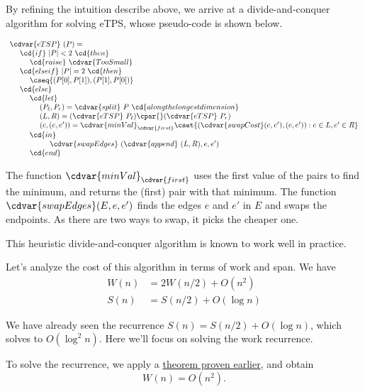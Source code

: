 \begin{algorithm}

By refining the intuition describe above, we arrive at a
divide-and-conquer algorithm for solving eTPS, whose pseudo-code is
shown below.

\[
\begin{array}{l}
\cdvar{eTSP}~(P) =
\\
~~~~\cd{if}~|P| < 2~\cd{then}
\\
~~~~~~~~\cd{raise}~\cdvar{TooSmall}
\\
~~~~\cd{else if}~|P| = 2~\cd{then}
\\
~~~~~~~~\cseq{(P[0],P[1]),(P[1],P[0])}
\\
~~~~\cd{else}
\\
~~~~~~~~\cd{let}
\\
~~~~~~~~~~~~(P_\ell, P_r) = \cdvar{split}~P~\cd{along the longest dimension}
\\
~~~~~~~~~~~~(L, R) = (\cdvar{eTSP}~P_\ell) \cpar{} (\cdvar{eTSP}~P_r)
\\
~~~~~~~~~~~~(c,(e,e')) = \cdvar{minVal}_{\cdvar{first}} \cset{(\cdvar{swapCost}(e,e'),(e,e')) : e \in L, e' \in R}
\\
~~~~~~~~\cd{in}
\\
~~~~~~~~~~~~~~~~\cdvar{swapEdges}~(\cdvar{append}~(L,R),e,e')
\\
~~~~~~~~\cd{end}
\end{array}
\]

The function $\cdvar{minVal}_{\cdvar{first}}$ uses the first value of
the pairs to find the minimum, and returns the (first) pair with that minimum. The function
$\cdvar{swapEdges}(E,e,e')$ finds the edges $e$ and $e'$ in $E$ and
swaps the endpoints. As there are two ways to swap, it picks the
cheaper one.
\end{algorithm}

\begin{remark} 
This heuristic divide-and-conquer algorithm is known to work well in
practice.
\end{remark}



\begin{gram}

Let's analyze the cost of this algorithm in terms of work and
span.  
%
We have
\begin{align*}
  W(n) & = 2W(n/2) + O(n^2)\\
  S(n) & =  S(n/2) + O(\log n)
\end{align*}
%

We have already seen the recurrence $S(n) = S(n/2) + O(\log n)$, which solves
to $O(\log^2 n).$  Here we'll focus on solving the work recurrence.  %


To solve the recurrence, we apply a 
%
\href{thm:analysis::recurrences::linear-plus}{theorem  proven earlier},
%
and obtain 
\[
W(n) = O(n^2).
\]
\end{gram}

